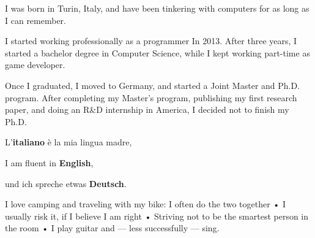 


I was born in Turin, Italy, and have been tinkering with computers for as long as I can remember. 

I started working professionally as a programmer In 2013. After three years, I started a bachelor degree in Computer Science, while I kept working part-time as game developer.

Once I graduated, I moved to Germany, and started a Joint Master and Ph.D. program. After completing my Master's program, publishing my first research paper, and doing an R\&D internship in America, I decided not to finish my Ph.D.


L'\textbf{italiano} è la mia lingua madre,

I am fluent in \textbf{English},

und ich spreche etwas \textbf{Deutsch}.


I love camping and traveling with my bike: I often do the two together • I usually risk it, if I believe I am right • Striving not to be the smartest person in the room • I play guitar and --- less successfully --- sing.